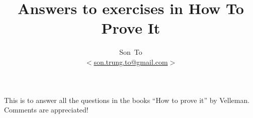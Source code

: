 \documentclass[a4paper,11pt]{article}
\author{Son~To\\
$<$\href{mailto:son.trung.to@gmail.com}{son.trung.to@gmail.com}$>$}
\affil{StaffPoint Oy}
\title{Answers to exercises in How To Prove It}
\theoremstyle{plain} \newtheorem{id}{Lemma}[section]
\theoremstyle{definition} \newtheorem{ex}{Exercise}[section]
\theoremstyle{remark}     \newtheorem{ab}{Conjecture}[section]
\begin{document}
  \maketitle
  This is to answer all the questions in the books ``How to prove it'' by Velleman.
  Comments are appreciated!

  \clearpage
  \tableofcontents
  \clearpage

  
\end{document}
